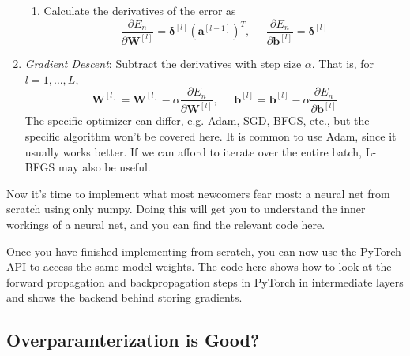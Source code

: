 \documentclass{article}
\begin{document}
\begin{algo}
\begin{enumerate}
\begin{enumerate}
        \item Calculate the derivatives of the error as 
        \begin{equation}
          \frac{\partial E_n}{\partial \mathbf{W}^{[l]}} = \boldsymbol{\delta}^{[l]} (\mathbf{a}^{[l-1]})^T, \;\;\;\;\; \frac{\partial E_n}{\partial \mathbf{b}^{[l]}} = \boldsymbol{\delta}^{[l]}
        \end{equation}
      \end{enumerate}
      
      \item \textit{Gradient Descent}: Subtract the derivatives with step size $\alpha$. That is, for $l = 1, \ldots, L$, 
      \begin{equation}
        \mathbf{W}^{[l]} = \mathbf{W}^{[l]} - \alpha \frac{\partial E_n}{\partial \mathbf{W}^{[l]}} , \;\;\;\;\; \mathbf{b}^{[l]} = \mathbf{b}^{[l]} - \alpha \frac{\partial E_n}{\partial \mathbf{b}^{[l]}}
      \end{equation}
      The specific optimizer can differ, e.g. Adam, SGD, BFGS, etc., but the specific algorithm won't be covered here. It is common to use Adam, since it usually works better. If we can afford to iterate over the entire batch, L-BFGS may also be useful. 
    \end{enumerate}
  \end{algo}

  \begin{code}
    Now it's time to implement what most newcomers fear most: a neural net from scratch using only numpy. Doing this will get you to understand the inner workings of a neural net, and you can find the relevant code \href{code/mlp_from_scratch.ipynb}{here}.  
  \end{code} 

  \begin{code}
    Once you have finished implementing from scratch, you can now use the PyTorch API to access the same model weights. The code \href{code/forward_backward.ipynb}{here} shows how to look at the forward propagation and backpropagation steps in PyTorch in intermediate layers and shows the backend behind storing gradients. 
  \end{code}

\subsection{Overparamterization is Good?} 
\end{document}
